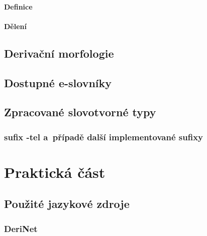 \hypertarget{definice}{%
\subsection{Definice}\label{definice}}

\hypertarget{dux11blenuxed}{%
\subsection{Dělení}\label{dux11blenuxed}}

\hypertarget{derivaux10dnuxed-morfologie}{%
\chapter{Derivační morfologie}\label{derivaux10dnuxed-morfologie}}

\hypertarget{dostupnuxe9-e-slovnuxedky}{%
\chapter{Dostupné e-slovníky}\label{dostupnuxe9-e-slovnuxedky}}

\hypertarget{zpracovanuxe9-slovotvornuxe9-typy}{%
\chapter{Zpracované slovotvorné
typy}\label{zpracovanuxe9-slovotvornuxe9-typy}}

\hypertarget{sufix--tel-a-pux159uxedpadux11b-dalux161uxed-implementovanuxe9-sufixy}{%
\section{sufix -tel a~případě další implementované
sufixy}\label{sufix--tel-a-pux159uxedpadux11b-dalux161uxed-implementovanuxe9-sufixy}}

\part{Praktická část}

\hypertarget{pouux17eituxe9-jazykovuxe9-zdroje}{%
\chapter{Použité jazykové
zdroje}\label{pouux17eituxe9-jazykovuxe9-zdroje}}

\hypertarget{derinet}{%
\section{DeriNet}\label{derinet}}

